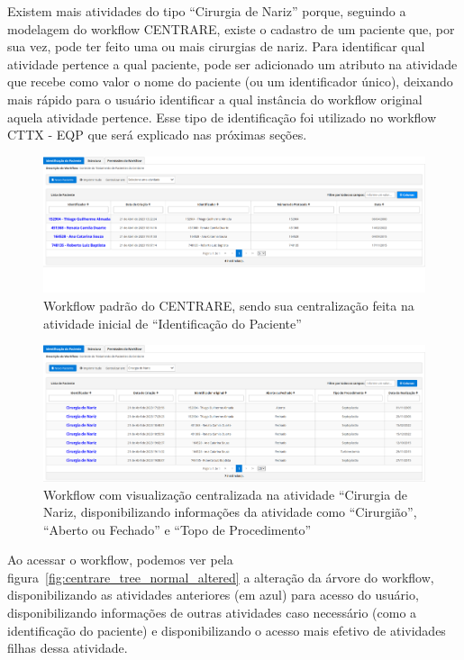 Existem mais atividades do tipo ``Cirurgia de Nariz'' porque, seguindo a modelagem do workflow CENTRARE, existe o cadastro de um paciente que, por sua vez, pode ter feito uma ou mais cirurgias de nariz. Para identificar qual atividade pertence a qual paciente, pode ser adicionado um atributo na atividade que recebe como valor o nome do paciente (ou um identificador único), deixando mais rápido para o usuário identificar a qual instância do workflow original aquela atividade pertence. Esse tipo de identificação foi utilizado no workflow CTTX - EQP que será explicado nas próximas seções.

\begin{figure}
    \centering
    \includegraphics[width=1\textwidth]{imgs/CENTRARE/instanciaNormal.png}
    \caption{Workflow padrão do CENTRARE, sendo sua centralização feita na atividade inicial de ``Identificação do Paciente''}
    \label{fig:normalInstance}
\end{figure}

\begin{figure}
    \centering
    \includegraphics[width=1\textwidth]{imgs/CENTRARE/instanciaAlterada.png}
    \caption{Workflow com visualização centralizada na atividade ``Cirurgia de Nariz, disponibilizando informações da atividade como ``Cirurgião'', ``Aberto ou Fechado'' e ``Topo de Procedimento''}
    \label{fig:changedInstance}
\end{figure}

Ao acessar o workflow, podemos ver pela figura~\ref{fig:centrare_tree_normal_altered} a alteração da árvore do workflow, disponibilizando as atividades anteriores (em azul) para acesso do usuário, disponibilizando informações de outras atividades caso necessário (como a identificação do paciente) e disponibilizando o acesso mais efetivo de atividades filhas dessa atividade.

